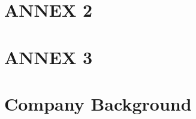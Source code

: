 \documentclass[11pt]{article}
\begin{document}
\section{ANNEX 2}
\section{ANNEX 3}
\section{Company Background}
\end{document}

